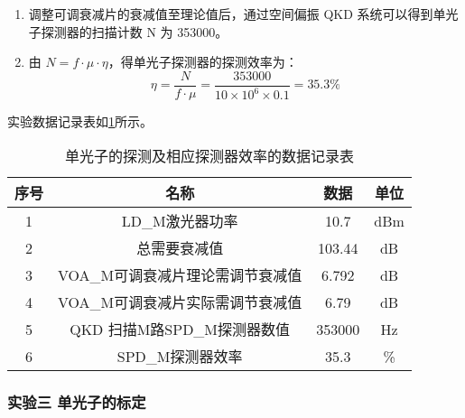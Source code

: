 \documentclass[dvipsnames, svgnames,a4paper,11pt]{article}
\begin{document}
\begin{enumerate}
\begin{itemize}
				\end{itemize}
			
			\item 调整可调衰减片的衰减值至理论值后，通过空间偏振 QKD 系统可以得到单光子探测器的扫描计数 N 为 353000。
			
			\item 由 $ N = f \cdot \mu \cdot \eta $，得单光子探测器的探测效率为：
				$$ \eta = \frac{N}{f \cdot \mu} = \frac{353000}{10 \times 10^{6} \times 0.1} = 35.3 \% $$

		\end{enumerate}

		实验数据记录表如\cref{tbl:D3-2-1}所示。

		\begin{table}[htbp]
			\centering
			\begin{tabular}{|c|c|cc|} 
			\hline
			序号 & 名称                  & 数据     & 单位   \\ 
			\hline
			1  & LD\_M激光器功率          & 10.7   & dBm  \\
			2  & 总需要衰减值              & 103.44 & dB   \\
			3  & VOA\_M可调衰减片理论需调节衰减值 & 6.792  & dB   \\
			4  & VOA\_M可调衰减片实际需调节衰减值 & 6.79   & dB   \\
			5  & QKD 扫描M路SPD\_M探测器数值 & 353000 & Hz   \\
			6  & SPD\_M探测器效率         & 35.3   & \%   \\
			\hline
			\end{tabular}
			\caption{单光子的探测及相应探测器效率的数据记录表}
			\label{tbl:D3-2-1}
		\end{table}
		

	\subsubsection{实验三 \quad 单光子的标定}
\end{document}
